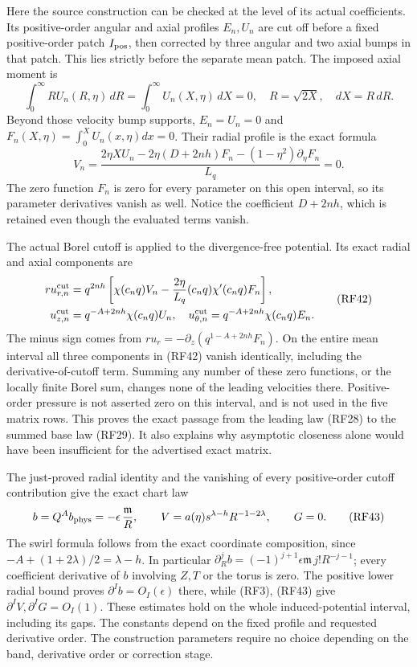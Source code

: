 \documentclass[10pt,a4paper]{article}
\newcounter{none}
\begin{document}
Here the source construction can be checked at the level of its actual
coefficients. Its positive-order angular and axial profiles \(E_n,U_n\)
are cut off before a fixed positive-order patch \(I_{\rm pos}\),
then corrected by three angular and two axial bumps in that patch.
This lies strictly before the separate mean patch. The imposed axial
moment is
\[
\int_0^\infty RU_n(R,\eta)\,dR
=\int_0^\infty U_n(X,\eta)\,dX=0,
\quad R=\sqrt{2X},\quad dX=R\,dR.
\tag{RF40}
\]
Beyond those velocity bump supports, \(E_n=U_n=0\) and
\(F_n(X,\eta)=\int_0^XU_n(x,\eta)dx=0\). Their radial profile
is the exact formula
\[
V_n=\frac{2\eta XU_n-2\eta(D+2nh)F_n-(1-\eta^2)\partial_\eta F_n}
{L_q}=0.
\tag{RF41}
\]
The zero function \(F_n\) is zero for every parameter on this open
interval, so its parameter derivatives vanish as well. Notice the
coefficient \(D+2nh\), which is retained even though the evaluated
terms vanish.

The actual Borel cutoff is applied to the divergence-free potential.
Its exact radial and axial components are
\[
\begin{split}
ru_{r,n}^{\rm cut}
&=q^{2nh}\left[\chi(c_nq)V_n-
\frac{2\eta}{L_q}(c_nq)\chi'(c_nq)F_n\right],\\
u_{z,n}^{\rm cut}&=q^{-A+2nh}\chi(c_nq)U_n,
\quad u_{\theta,n}^{\rm cut}=q^{-A+2nh}\chi(c_nq)E_n.
\end{split}
\tag{RF42}
\]
The minus sign comes from \(ru_r=-\partial_z(q^{1-A+2nh}F_n)\).
On the entire mean interval all three components in (RF42) vanish
identically, including the derivative-of-cutoff term. Summing any
number of these zero functions, or the locally finite Borel sum, changes
none of the leading velocities there. Positive-order pressure is not
asserted zero on this interval, and is not used in the five matrix rows.
This proves the exact passage from the leading law (RF28) to the summed
base law (RF29). It also explains why asymptotic closeness alone would
have been insufficient for the advertised exact matrix.

The just-proved radial identity and the vanishing of every
positive-order cutoff contribution give the exact chart law
\[
b=Q^Ab_{\rm phys}
=-\epsilon\,\frac{\mathfrak m}{R},\qquad
V=a(\eta)s^{\lambda-h}R^{-1-2\lambda},\qquad G=0.
\tag{RF43}
\]
The swirl formula follows from the exact coordinate composition,
since \(-A+(1+2\lambda)/2=\lambda-h\).
In particular
\(\partial_R^jb=(-1)^{j+1}\epsilon\mathfrak m\,j!R^{-j-1}\);
every coefficient derivative of \(b\) involving \(Z,T\) or the torus
is zero. The positive lower radial bound proves
\(\partial^Ib=O_I(\epsilon)\) there, while (RF3), (RF43) give
\(\partial^IV,\partial^IG=O_I(1)\). These estimates hold on the
whole induced-potential interval, including its gaps. The constants
depend on the fixed profile and requested derivative order. The
construction parameters require no choice depending on the band,
derivative order or correction stage.
\end{document}
